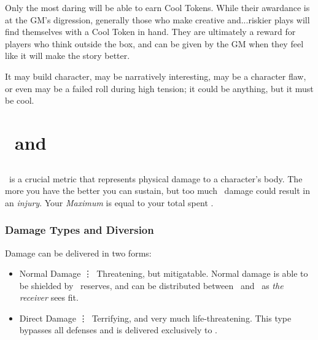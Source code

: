Only the most daring will be able to earn Cool Tokens. While their awardance is at the GM's digression, generally those who make creative and...riskier plays will find themselves with a Cool Token in hand. They are ultimately a reward for players who think outside the box, and can be given by the GM when they feel like it will make the story better.

It may build character, may be narratively interesting, may be a character flaw, or even may be a failed roll during high tension; it could be anything, but it must be cool.


\chapter{\HPful\ and \ENful}\label{ch:hp_and_en}
\section{\HPful\index{\HPful}}\label{sec:hp}
\HPful\ is a crucial metric that represents physical damage to a character's body. The more you have the better you can sustain, but too much \HPful\ damage could result in an \textit{injury}. Your \emph{Maximum \HPful} is equal to your total spent \attrval{}.


\subsection{Damage Types and Diversion}\label{subsec:damage_types}
Damage can be delivered in two forms:
\begin{itemize}
	\item Normal Damage \vdots\ Threatening, but mitigatable. Normal damage is able to be shielded by \ENful\ reserves, and can be distributed between \HPful\ and \ENful\ as \emph{the receiver} sees fit.
	\item Direct Damage \vdots\ Terrifying, and very much life-threatening. This type bypasses all defenses and is delivered exclusively to \HPful .
\end{itemize}

